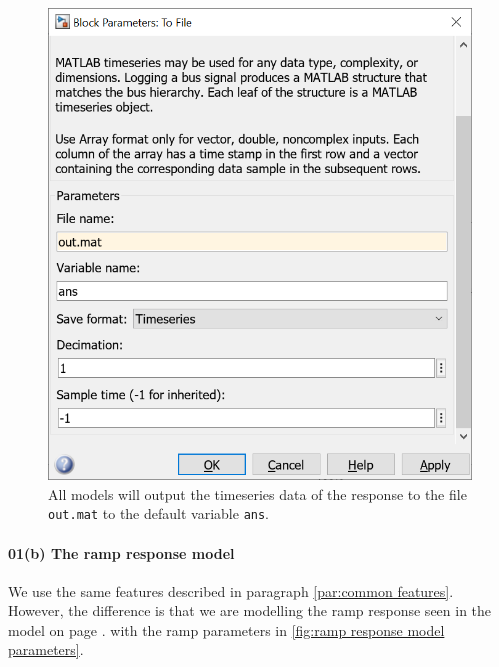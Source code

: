 \documentclass[12pt]{article}
\begin{document}
\begin{figure}[h]
    \centering
    \includegraphics[width=(5in/689)*688]{common_to_file.png}
    \caption{All models will output the timeseries data of the response to the file \texttt{out.mat} to the default variable \texttt{ans}.}
    \label{fig:common to file}
\end{figure}

\paragraph{01(b) The ramp response model}

We use the same features described in paragraph \ref{par:common features}.
However, the difference is that we are modelling the ramp response seen
in the model on page \pageref{pdf:part01b}.
with the ramp parameters in \ref{fig:ramp response model parameters}.



\end{document}

